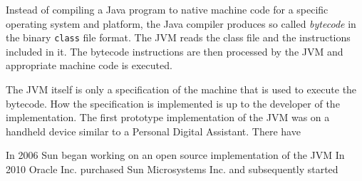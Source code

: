 
Instead of compiling a Java program to native machine code for a specific operating system and platform, the Java compiler produces so called \textit{bytecode} in the binary \texttt{class} file format. The JVM reads the class file and the instructions included in it. The bytecode instructions are then processed by the JVM and appropriate machine code is executed.  

The JVM itself is only a specification of the machine that is used to execute the bytecode. How the specification is implemented is up to the developer of the implementation. The first prototype implementation of the JVM was on a handheld device similar to a Personal Digital Assistant. There have 


In 2006 Sun began working on an open source implementation of the JVM 
In 2010 Oracle Inc. purchased Sun Microsystems Inc. and subsequently started 


